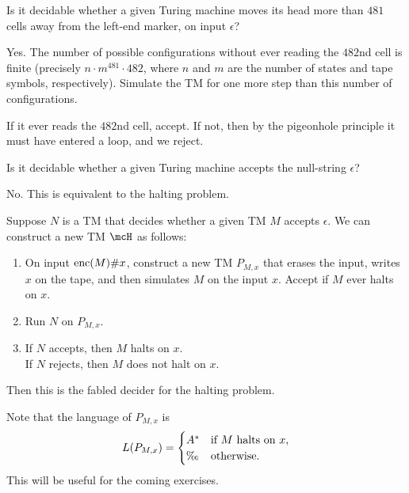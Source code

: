 \begin{exercise}
    Is it decidable whether a given Turing machine moves its head more than
    $481$ cells away from the left-end marker, on input $\epsilon$?
\end{exercise}
\begin{solution}
    Yes.
    The number of possible configurations without ever reading the $482$nd
    cell is finite (precisely $n \cdot m^{481} \cdot 482$, where $n$ and $m$
    are the number of states and tape symbols, respectively).
    Simulate the TM for one more step than this number of configurations.

    If it ever reads the $482$nd cell, accept.
    If not, then by the pigeonhole principle it must have entered a loop,
    and we reject.
\end{solution}

\begin{exercise} \label{thm:decidability:epsilon}
    Is it decidable whether a given Turing machine accepts the null-string
    $\epsilon$?
\end{exercise}
\begin{solution}
    No.
    This is equivalent to the halting problem.

    Suppose $N$ is a TM that decides whether a given TM $M$ accepts
    $\epsilon$.
    We can construct a new TM $\mcH$ as follows:
    \begin{enumerate}
        \item On input $\operatorname{enc}(M)\#x$, construct a new TM $P_{M, x}$ that
            erases the input, writes $x$ on the tape,
            and then simulates $M$ on the input $x$.
            Accept if $M$ ever halts on $x$.
        \item Run $N$ on $P_{M, x}$.
        \item If $N$ accepts, then $M$ halts on $x$. \\
        If $N$ rejects, then $M$ does not halt on $x$.
    \end{enumerate}
    Then this \mcH{} is the fabled decider for the halting problem.
\end{solution}

Note that the language of $P_{M, x}$ is \[
    L(P_{M, x}) = \begin{cases}
        A^* & \text{if } M \text{ halts on } x, \\
        \O & \text{otherwise}.
    \end{cases}
\] This will be useful for the coming exercises.

